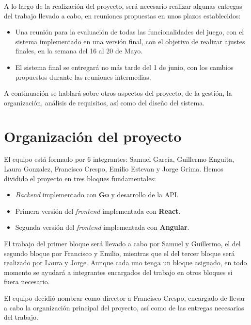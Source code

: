 \documentclass[11pt, a4paper, titlepage]{article}
\begin{document}
A lo largo de la realización del proyecto, será necesario realizar algunas entregas del trabajo llevado a cabo, en reuniones propuestas en unos plazos establecidos:

\begin{itemize}
    \item Una reunión para la evaluación de todas las funcionalidades del juego, con el sistema implementado en una versión final, con el objetivo de realizar ajustes finales, en la semana del 16 al 20 de Mayo.
    \item El sistema final se entregará no más tarde del 1 de junio, con los cambios propuestos durante las reuniones intermedias.
\end{itemize}

A continuación se hablará sobre otros aspectos del proyecto, de la gestión, la organización, análisis de requisitos, así como del diseño del sistema.

\section{Organización del proyecto}
El equipo está formado por 6 integrantes: Samuel García, Guillermo Enguita, Laura Gonzalez, Francisco Crespo, Emilio Estevan y Jorge Grima.
Hemos dividido el proyecto en tres bloques fundamentales:\newline
\begin{itemize}
    \item \textit{Backend} implementado con \textbf{Go} y desarrollo de la API.
    \item Primera versión del \textit{frontend} implementada con \textbf{React}.
    \item Segunda versión del \textit{frontend} implementada con \textbf{Angular}.\newline
\end{itemize}

El trabajo del primer bloque será llevado a cabo por Samuel y Guillermo, el del segundo bloque por Francisco y Emilio, mientras que el del tercer bloque será realizado por Laura y Jorge. 
Aunque cada uno tenga un bloque asignado, en todo momento se ayudará a integrantes encargados del trabajo en otros bloques si fuera necesario. \newline

El equipo decidió nombrar como director a Francisco Crespo, encargado de llevar a cabo la organización principal del proyecto, así como de las entregas necesarias del trabajo.
\end{document}
